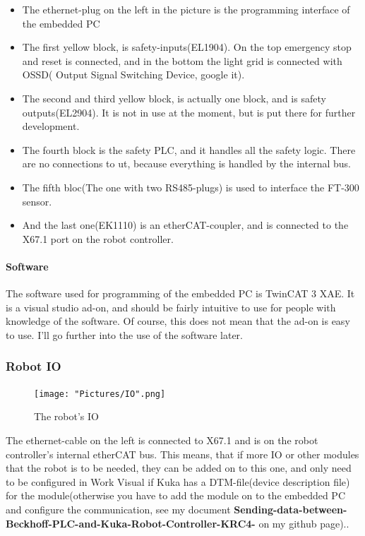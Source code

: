\documentclass{article}
\begin{document}
        \begin{itemize}
            \item The ethernet-plug on the left in the picture is the programming interface of the embedded PC
            \item The first yellow block, is safety-inputs(EL1904). On the top emergency stop and reset is connected, and in the bottom the light grid is connected with OSSD( Output Signal Switching Device, google it). 
            \item The second and third yellow block, is actually one block, and is safety outputs(EL2904). It is not in use at the moment, but is put there for further development. 
            \item The fourth block is the safety PLC, and it handles all the safety logic. There are no connections to ut, because everything is handled by the internal bus.
            \item The fifth bloc(The one with two RS485-plugs) is used to interface the FT-300 sensor.
            \item And the last one(EK1110) is an etherCAT-coupler, and is connected to the X67.1 port on the robot controller. 
        \end{itemize}
        
        \newpage
        
        \paragraph{Software}
        The software used for programming of the embedded PC is TwinCAT 3 XAE. It is a visual studio ad-on, and should be fairly intuitive to use for people with knowledge of the software. Of course, this does not mean that the ad-on is easy to use. I'll go further into the use of the software later. 
        
        \subsubsection{Robot IO}
        \begin{figure}[!h]
            \centering
            \texttt{[image: "Pictures/IO".png]}
            \caption{The robot's IO}
        \end{figure}
        
        The ethernet-cable on the left is connected to X67.1 and is on the robot controller's internal etherCAT bus. This means, that if more IO or other modules that the robot is to be needed, they can be added on to this one, and only need to be configured in Work Visual if Kuka has a DTM-file(device description file) for the module(otherwise you have to add the module on to the embedded PC and configure the communication, see my document \textbf{Sending-data-between-Beckhoff-PLC-and-Kuka-Robot-Controller-KRC4-} on my github page)..
        
\end{document}
